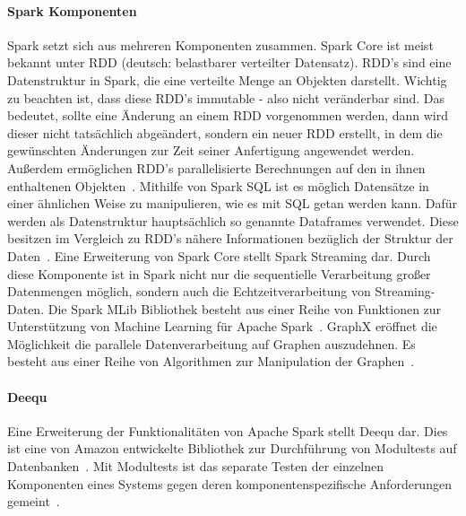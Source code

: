 \paragraph{Spark Komponenten}
Spark setzt sich aus mehreren Komponenten zusammen.
\newline
Spark Core ist meist bekannt unter \ac{RDD} (deutsch: belastbarer verteilter Datensatz). \ac{RDD}'s sind eine Datenstruktur in Spark, die eine verteilte Menge an Objekten darstellt. Wichtig zu beachten ist, dass diese \ac{RDD}'s immutable - also nicht veränderbar sind. Das bedeutet, sollte eine Änderung an einem \ac{RDD} vorgenommen werden, dann wird dieser nicht tatsächlich abgeändert, sondern ein neuer RDD erstellt, in dem die gewünschten Änderungen zur Zeit seiner Anfertigung angewendet werden. Außerdem ermöglichen \ac{RDD}'s parallelisierte Berechnungen auf den in ihnen enthaltenen Objekten~\cite{Chellappan.2018}.
\newline
Mithilfe von Spark \ac{SQL} ist es möglich Datensätze in einer ähnlichen Weise zu manipulieren, wie es mit \ac{SQL} getan werden kann. Dafür werden als Datenstruktur hauptsächlich so genannte Dataframes verwendet. Diese besitzen im Vergleich zu \ac{RDD}'s nähere Informationen bezüglich der Struktur der Daten~\cite{Bengfort.2016}.
\newline
Eine Erweiterung von Spark Core stellt Spark Streaming dar. Durch diese Komponente ist in Spark nicht nur die sequentielle Verarbeitung großer Datenmengen möglich, sondern auch die Echtzeitverarbeitung von Streaming-Daten.
\newline
Die Spark \ac{MLib} Bibliothek besteht aus einer Reihe von Funktionen zur Unterstützung von Machine Learning für Apache Spark~\cite{Chellappan.2018}.
\newline
GraphX eröffnet die Möglichkeit die parallele Datenverarbeitung auf Graphen auszudehnen. Es besteht aus einer Reihe von Algorithmen zur Manipulation der Graphen~\cite{Bengfort.2016}.


\paragraph{Deequ}
Eine Erweiterung der Funktionalitäten von Apache Spark stellt Deequ dar. Dies ist eine von Amazon entwickelte Bibliothek zur Durchführung von Modultests auf Datenbanken~\cite{Schelter.2018}. Mit Modultests ist das separate Testen der einzelnen Komponenten eines Systems gegen deren komponentenspezifische Anforderungen gemeint~\cite{Mili.2015}. 
\newline


